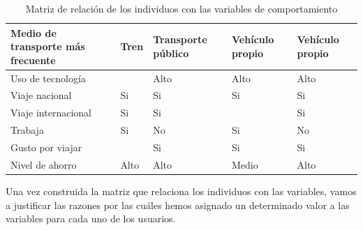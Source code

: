 \begin{table}[H]
\begin{tabular}{|p{10em}|p{7em}|p{7em}|p{7em}|p{8em}|}
        Medio de transporte más frecuente & Tren                                        & Transporte público                            & Vehículo propio                               & Vehículo propio                               \\ \hline
        Uso de tecnología                 &                                             & Alto                                          & Alto                                          & Alto                                          \\ \hline
        Viaje nacional                    & Si                                          & Si                                            & Si                                            & Si                                            \\ \hline
        Viaje internacional               & Si                                          & Si                                            &                                               & Si                                            \\ \hline
        Trabaja                           & Si                                          & No                                            & Si                                            & No                                            \\ \hline
        Gusto por viajar                  &                                             & Si                                            & Si                                            & Si                                            \\ \hline
        Nivel de ahorro                   & Alto                                        & Alto                                          & Medio                                         & Alto                                          \\ \hline
    \end{tabular}
    \caption{Matriz de relación de los individuos con las variables de comportamiento}
    \label{table:relacion-individuos-variables}
\end{table}

Una vez construida la matriz que relaciona los individuos con las variables, vamos a justificar las razones por las cuáles hemos asignado un
determinado valor a las variables para cada uno de los usuarios. \\

